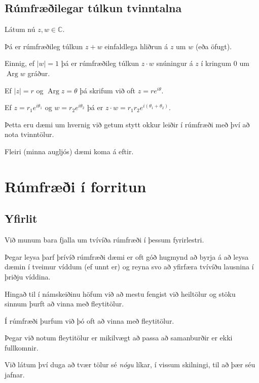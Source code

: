 \subsection{Rúmfræðilegar túlkun tvinntalna}
{
    {
        \item<1-> Látum nú $z, w \in \mathbb{C}$.
        \item<2-> Þá er rúmfræðileg túlkun $z + w$ einfaldlega hliðrun á $z$ um $w$ (eða öfugt).
        \item<3-> Einnig, ef $|w| = 1$ þá er rúmfræðileg túlkun $z \cdot w$ snúningur á $z$ í kringum $0$ um $\operatorname{Arg} w$ gráður.
        \item<4-> Ef $|z| = r$ og $\operatorname{Arg} z = \theta$ þá skrifum við oft $z = re^{i\theta}$.
        \item<5-> Ef $z = r_1e^{i\theta_1}$ og $w = r_2e^{i\theta_2}$ þá er $z \cdot w = r_1r_2e^{i(\theta_1 + \theta_2)}$.
        \item<6-> Þetta eru dæmi um hvernig við getum stytt okkur leiðir í rúmfræði með því að nota tvinntölur.
        \item<7-> Fleiri (minna augljós) dæmi koma á eftir.
    }
}

\section{Rúmfræði í forritun}
\subsection{Yfirlit}
{
    {
        \item<1-> Við munum bara fjalla um tvívíða rúmfræði í þessum fyrirlestri.
        \item<2-> Þegar leysa þarf þrívíð rúmfræði dæmi er oft góð hugmynd að byrja
                    á að leysa dæmin í tveimur víddum (ef unnt er) og reyna svo að yfirfæra tvívíðu lausnina í þriðju víddina.
        \item<3-> Hingað til í námskeiðinu höfum við að mestu fengist við heiltölur og stöku sinnum þurft að vinna með fleytitölur.
        \item<4-> Í rúmfræði þurfum við þó oft að vinna með fleytitölur.
        \item<5-> Þegar við notum fleytitölur er mikilvægt að passa að samanburðir er ekki fullkomnir.
        \item<6-> Við látum því duga að tvær tölur sé \emph{nógu} líkar, í vissum skilningi, til að þær séu jafnar.
    }
}

